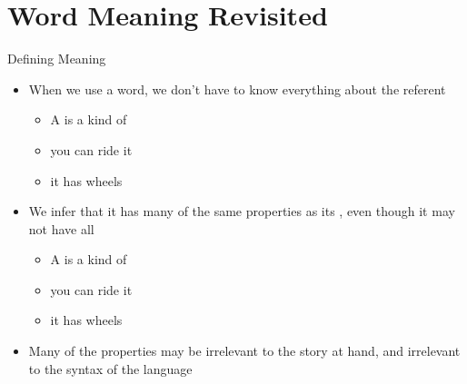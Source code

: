\section{Word Meaning Revisited}



\begin{frame}{Defining Meaning}

\begin{itemize}
\item When we use a word, we don't have to know everything about the
  referent
  \begin{itemize}
  \item A  is a kind of 
  \item[\ent] you can ride it
  \item[\ent] it has wheels
  \end{itemize}
\item We infer that it has many of the same properties as its
  , even though it may not have all
 \begin{itemize}
  \item A  is a kind of 
  \item[\ent] you can ride it
  \item[$\not\Rightarrow$] it has wheels
  \end{itemize}
\item Many of the properties may be irrelevant to the story at hand,
  and irrelevant to the syntax of the language
\end{itemize}

\end{frame}

